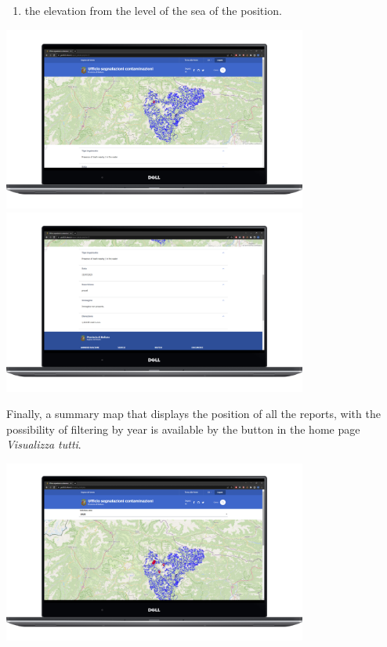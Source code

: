 \begin{itemize}
\begin{enumerate}
        \item the elevation from the level of the sea of the position.
    \end{enumerate}
    \begin{center} \includegraphics[width=27em]{img/pos_rep.png} \includegraphics[width=27em]{img/dati_rep.png} \end{center}
    Finally, a summary map that displays the position of all the reports, with the possibility of filtering by year is available by the button in the home page \textit{Visualizza tutti}.
    \begin{center} \includegraphics[width=27em]{img/all_reports.png} \end{center}
    
\end{itemize}

